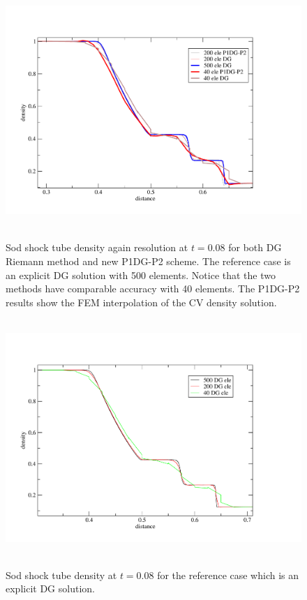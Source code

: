 \begin{figure}[H]
\vbox{
\hbox{
\hspace{-1.cm}
\includegraphics[width=16.0cm]{./doc_figures/shock/test-sod}
}
\vspace{-0.cm}
\vspace{-0.cm}}
\label{sod-converg-density}
\caption{ Sod shock tube density again resolution at $t=0.08$ 
for both DG Riemann method and new P1DG-P2 scheme. 
The reference case is an explicit DG solution with 500 elements. 
Notice that the two methods 
have comparable accuracy with 40 elements. The 
P1DG-P2 results show the FEM interpolation of the CV density solution.}
\end{figure}



\begin{figure}[H]
\vbox{
\hbox{
\hspace{-1.cm}
\includegraphics[width=16.0cm]{./doc_figures/shock/sod-dg-0-08}
}
\vspace{-0.cm}
\vspace{-0.cm}}
\label{sod-40ele-density}
\caption{ Sod shock tube density at $t=0.08$ for the 
reference case which is an explicit DG solution.  }
\end{figure}



